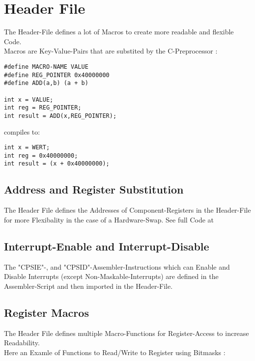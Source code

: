 
\section{Header File}

The Header-File defines a lot of Macros to create more readable and flexible Code.\\
Macros are Key-Value-Pairs that are substited by the C-Preprocessor :

\begin{lstlisting}[language=Clang,caption=Macro Defintion Example]
#define MACRO-NAME VALUE
#define REG_POINTER 0x40000000
#define ADD(a,b) (a + b)

int x = VALUE;
int reg = REG_POINTER;
int result = ADD(x,REG_POINTER);
\end{lstlisting}
\vspace{-25px}
\begin{center}
	\Large compiles to:
\end{center}
\begin{lstlisting}[language=Clang,caption=Substitued Values]
int x = WERT;
int reg = 0x40000000;
int result = (x + 0x40000000);
\end{lstlisting}

\subsection{Address and Register Substitution}

The Header File defines the Addresses of Component-Registers in the Header-File for more Flexibality in the case of a Hardware-Swap.
See full Code at 



\subsection{Interrupt-Enable and Interrupt-Disable}

The "CPSIE"-, and "CPSID"-Assembler-Instructions which can Enable and Disable Interrupts (except Non-Maskable-Interrupts) are defined in the Assembler-Script and then imported in the Header-File.





\subsection{Register Macros}

The Header File defines multiple Macro-Functions for Register-Access to increase Readability.\\
Here an Examle of Functions to Read/Write to Register using Bitmasks :




\pagebreak

